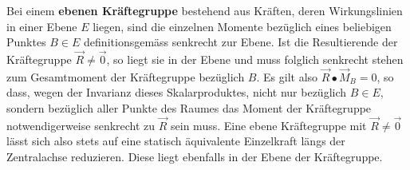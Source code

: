 Bei einem \textbf{ebenen Kräftegruppe} bestehend aus Kräften, deren Wirkungslinien in einer Ebene $E$ liegen, sind die einzelnen Momente bezüglich eines beliebigen Punktes $B\in E$ definitionsgemäss senkrecht zur Ebene. Ist die Resultierende der Kräftegruppe $\overrightarrow{R}\neq \overrightarrow{0}$, so liegt sie in der Ebene und muss folglich senkrecht stehen zum Gesamtmoment der Kräftegruppe bezüglich $B$. Es gilt also $\overrightarrow{R}\bullet \overrightarrow{M}_B=0$, so dass, wegen der Invarianz dieses Skalarproduktes, nicht nur bezüglich $B\in E$, sondern bezüglich aller Punkte des Raumes das Moment der Kräftegruppe notwendigerweise senkrecht zu $\overrightarrow{R}$ sein muss. Eine ebene Kräftegruppe mit $\overrightarrow{R}\neq \overrightarrow{0}$ lässt sich also stets auf eine statisch äquivalente Einzelkraft längs der Zentralachse reduzieren. Diese liegt ebenfalls in der Ebene der Kräftegruppe. 